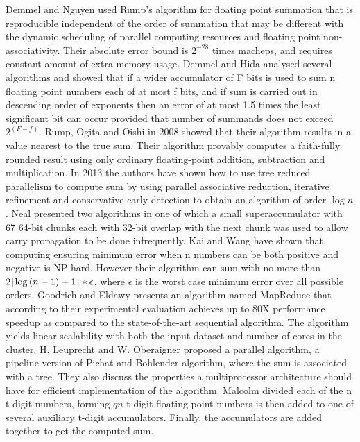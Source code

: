 \documentclass[11pt]{article}       %
\DeclarePairedDelimiter{\ceil}{\lceil}{\rceil}
\begin{document}
Demmel and Nguyen \cite{PRS} used Rump’s algorithm for floating point summation that is reproducible independent of the order of summation that may be different with the dynamic scheduling of parallel computing resources and floating point non-associativity. Their absolute error bound is $2^{-28}$ times macheps, and requires constant amount of extra memory usage. Demmel and Hida \cite{AEFPS} analysed several algorithms and showed that if a wider accumulator of F bits is used to sum n floating point numbers each of at most f bits, and if sum is carried out in descending order of exponents then an error of at most 1.5 times the least significant bit can occur provided that number of summands does not exceed $2^{(F-f)}$.
Rump, Ogita and Oishi \cite{AFPSPFR} in 2008 showed that their algorithm results in a value nearest to the true sum. Their algorithm provably computes a faith-fully rounded result using only ordinary floating-point addition, subtraction and multiplication.
In 2013 the authors \cite{APFPA} have shown how to use tree reduced parallelism to compute sum by using parallel associative reduction, iterative refinement and conservative early detection to obtain an algorithm of order $\log {n}$. 
Neal \cite{FESUSLS} presented two algorithms in one of which a small superaccumulator with 67 64-bit chunks each with 32-bit overlap with the next chunk was used to allow carry propagation to be done infrequently. Kai and Wang \cite{LTALCNS} have shown that computing ensuring minimum error when n numbers can be both positive and negative is NP-hard. However their algorithm can sum with no more than $2\ceil*{\log {(n-1)}+1}*\epsilon$, where $\epsilon$ is the worst case minimum error over all possible orders.
Goodrich and Eldawy \cite{PASFPN} presents an algorithm named MapReduce that according to their experimental evaluation achieves up to 80X performance speedup as compared to the state-of-the-art sequential algorithm. The algorithm yields linear scalability with both the input dataset and number of cores in the cluster.
H. Leuprecht and W. Oberaigner \cite{PARESFP} proposed a parallel algorithm, a pipeline version of Pichat and Bohlender algorithm, where the sum is associated with a tree. They also discuss the properties a multiprocessor architecture should have for efficient implementation of the algorithm.
Malcolm \cite{OAFPS} divided each of the n t-digit numbers, forming $qn$ t-digit floating point numbers is then added to one of several auxiliary t-digit accumulators. Finally, the accumulators are added together to get the computed sum.
\end{document}
